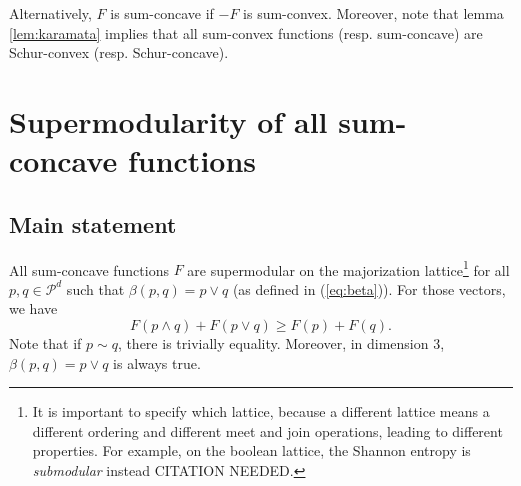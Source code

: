 \noindent Alternatively, $F$ is sum-concave if $-F$ is sum-convex. Moreover, note that lemma \ref{lem:karamata} implies that all sum-convex functions (resp. sum-concave) are Schur-convex (resp. Schur-concave).



\section{Supermodularity of all sum-concave functions} \label{sec:alternative_supermodularity}

\subsection{Main statement}

\begin{theorem} \label{th:alternative_supermodularity}
    All sum-concave functions $F$ are supermodular on the majorization lattice\footnote{It is important to specify which lattice, because a different lattice means a different ordering and different meet and join operations, leading to different properties. For example, on the boolean lattice, the Shannon entropy is \textit{submodular} instead CITATION NEEDED.} for all $p, q \in \mathcal{P}^d$ such that $\beta(p, q) = p \vee q$ (as defined in (\ref{eq:beta})). For those vectors, we have
    \begin{equation} \label{eq:supermodularity}
        F(p \wedge q) + F(p \vee q) \geq F(p) + F(q).
    \end{equation}
    Note that if $p \sim q$, there is trivially equality. Moreover, in dimension 3, $\beta(p, q) = p \vee q$ is always true.
\end{theorem}

